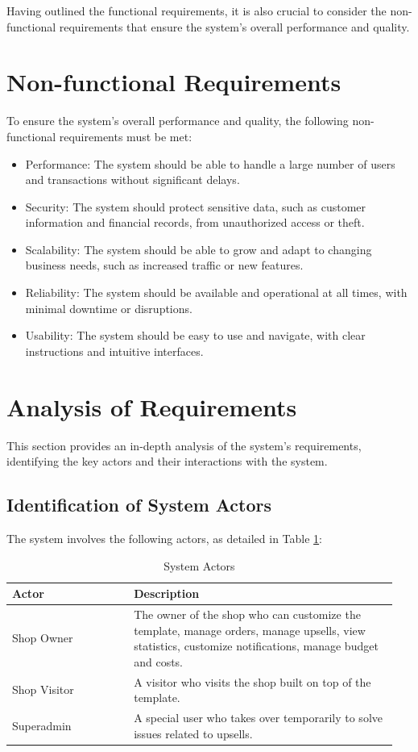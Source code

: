Having outlined the functional requirements, it is also crucial to consider the non-functional requirements that ensure the system's overall performance and quality.

\section{Non-functional Requirements}
To ensure the system's overall performance and quality, the following non-functional requirements must be met:
\begin{itemize}
    \item Performance: The system should be able to handle a large number of users and transactions without significant delays.
    \item Security: The system should protect sensitive data, such as customer information and financial records, from unauthorized access or theft.
    \item Scalability: The system should be able to grow and adapt to changing business needs, such as increased traffic or new features.
    \item Reliability: The system should be available and operational at all times, with minimal downtime or disruptions.
    \item Usability: The system should be easy to use and navigate, with clear instructions and intuitive interfaces.
\end{itemize}

\section{Analysis of Requirements}
This section provides an in-depth analysis of the system's requirements, identifying the key actors and their interactions with the system.

\subsection{Identification of System Actors}
The system involves the following actors, as detailed in Table \ref{tab:actors}:

\begin{table}[H] %
\centering
\begin{tabular}{|p{0.3\linewidth}|p{0.65\linewidth}|} %
\hline
\textbf{Actor} & \textbf{Description} \\
\hline
Shop Owner & The owner of the shop who can customize the template, manage orders, manage upsells, view statistics, customize notifications, manage budget and costs. \\
\hline
Shop Visitor & A visitor who visits the shop built on top of the template. \\
\hline
Superadmin & A special user who takes over temporarily to solve issues related to upsells. \\
\hline
\end{tabular}
\caption{System Actors}
\label{tab:actors}
\end{table}


